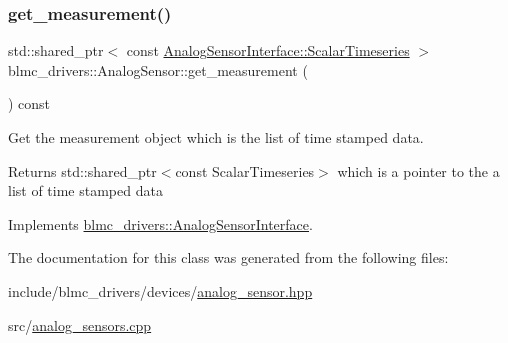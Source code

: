 \subsubsection{\texorpdfstring{get\+\_\+measurement()}{get\_measurement()}}
{\footnotesize\ttfamily std\+::shared\+\_\+ptr$<$ const \hyperlink{classblmc__drivers_1_1AnalogSensorInterface_a4e4a853aa044b7d3afbaa3fe20477602}{Analog\+Sensor\+Interface\+::\+Scalar\+Timeseries} $>$ blmc\+\_\+drivers\+::\+Analog\+Sensor\+::get\+\_\+measurement (\begin{DoxyParamCaption}{ }\end{DoxyParamCaption}) const\hspace{0.3cm}{\ttfamily [virtual]}}



Get the measurement object which is the list of time stamped data. 

\begin{DoxyReturn}{Returns}
std\+::shared\+\_\+ptr$<$const Scalar\+Timeseries$>$ which is a pointer to the a list of time stamped data 
\end{DoxyReturn}


Implements \hyperlink{classblmc__drivers_1_1AnalogSensorInterface_afd694f79c9fec5a35984d468f59f315c}{blmc\+\_\+drivers\+::\+Analog\+Sensor\+Interface}.



The documentation for this class was generated from the following files\+:\begin{DoxyCompactItemize}
\item 
include/blmc\+\_\+drivers/devices/\hyperlink{analog__sensor_8hpp}{analog\+\_\+sensor.\+hpp}\item 
src/\hyperlink{analog__sensors_8cpp}{analog\+\_\+sensors.\+cpp}\end{DoxyCompactItemize}
